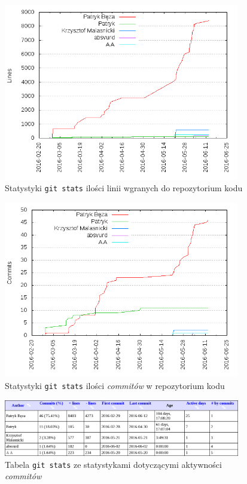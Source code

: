 \documentclass[a4paper,titlepage]{article}
\theoremstyle{break}
\numberwithin{equation}{subsection}
\begin{document}
\begin{figure}[H]
\center
\includegraphics[width=0.92\textwidth]{img/git_stats-lines_of_code_by_author}
\caption{Statystyki \texttt{git~stats} ilości linii wgranych do repozytorium kodu}
\label{fig:git-stats}
\end{figure}

\begin{figure}[H]
\center
\includegraphics[width=0.92\textwidth]{img/git_stats-commits_by_author}
\caption{Statystyki \texttt{git~stats} ilości \emph{commitów} w repozytorium kodu}
\label{fig:git-stats-2}
\end{figure}

\begin{figure}[H]
\center
\includegraphics[width=0.92\textwidth]{img/git_stats-commits}
\caption{Tabela \texttt{git stats} ze statystykami dotyczącymi aktywności \emph{commitów}}
\label{fig:git-stats-3}
\end{figure}


\clearpage
\printbibliography[title=Bibliografia]
\end{document}

